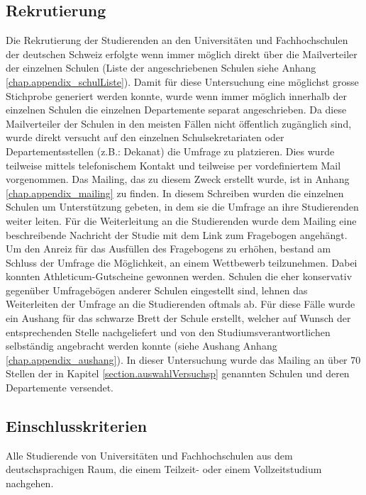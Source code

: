\subsection{Rekrutierung}\label{subsection.rekrutierung}
Die Rekrutierung der Studierenden an den Universitäten und Fachhochschulen der deutschen Schweiz erfolgte wenn immer möglich direkt über die Mailverteiler der einzelnen Schulen (Liste der angeschriebenen Schulen siehe Anhang \ref{chap.appendix_schulListe}). Damit für diese Untersuchung eine möglichst grosse Stichprobe generiert werden konnte, wurde wenn immer möglich innerhalb der einzelnen Schulen die einzelnen Departemente separat angeschrieben. Da diese Mailverteiler der Schulen in den meisten Fällen nicht öffentlich zugänglich sind, wurde direkt versucht auf den einzelnen Schulsekretariaten oder Departementsstellen (z.B.: Dekanat) die Umfrage zu platzieren. Dies wurde teilweise mittels telefonischem Kontakt und teilweise per vordefiniertem Mail vorgenommen. Das Mailing, das zu diesem Zweck erstellt wurde, ist in Anhang \ref{chap.appendix_mailing} zu finden. In diesem Schreiben wurden die einzelnen Schulen um Unterstützung gebeten, in dem sie die Umfrage an ihre Studierenden weiter leiten. Für die Weiterleitung an die Studierenden wurde dem Mailing eine beschreibende Nachricht der Studie mit dem Link zum Fragebogen angehängt. Um den Anreiz für das Ausfüllen des Fragebogens zu erhöhen, bestand am Schluss der Umfrage die Möglichkeit, an einem Wettbewerb teilzunehmen. Dabei konnten Athleticum-Gutscheine gewonnen werden. Schulen die eher konservativ gegenüber Umfragebögen anderer Schulen eingestellt sind, lehnen das Weiterleiten der Umfrage an die Studierenden oftmals ab. Für diese Fälle wurde ein Aushang für das schwarze Brett der Schule erstellt, welcher auf Wunsch der entsprechenden Stelle nachgeliefert und von den Studiumsverantwortlichen selbständig angebracht werden konnte (siehe Aushang Anhang \ref{chap.appendix_aushang}). In dieser Untersuchung wurde das Mailing an über 70 Stellen der in Kapitel \ref{section.auswahlVersuchsp} genannten Schulen und deren Departemente versendet.

\subsection{Einschlusskriterien}\label{subsection.einschlusskriterien}
Alle Studierende von Universitäten und Fachhochschulen aus dem deutschsprachigen Raum, die einem Teilzeit- oder einem Vollzeitstudium nachgehen.


